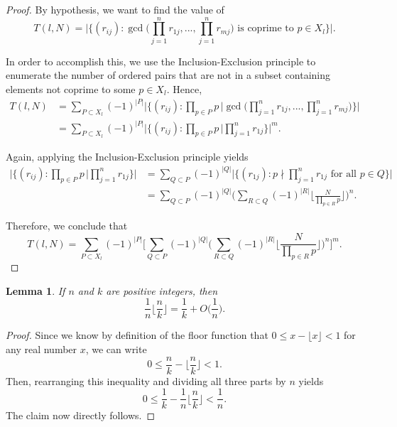 \documentclass[10pt,a4paper]{article}
\newtheorem{lemma}[theorem]{Lemma}
\theoremstyle{definition}
\theoremstyle{remark}
\newtheorem{note}{Note}[section]
\begin{document}
\begin{proof}


By hypothesis, we want to find the value of
$$T(l,N) = \Big|\Big\{(r_{ij}) : \gcd\Big(\prod_{j=1}^nr_{1j}, ..., \prod_{j=1}^{n} r_{mj}\Big) \text{ is coprime to } p\in X_l \Big\}\Big|.$$

In order to accomplish this, we use the Inclusion-Exclusion principle to enumerate the number of ordered pairs that are not in a subset containing elements not coprime to some $p\in X_l$. Hence, 
\begin{align}
T(l, N) &= \sum_{P\subset X_l}{(-1)^{|P|}}\Bigg|\Big\{(r_{ij}):\prod_{p\in P} p \, \Big| \gcd\Big(\prod_{j=1}^nr_{1j}, ... ,\prod_{j=1}^{n} r_{mj}\Big) \Big\} \Bigg|\\ &= \sum_{P\subset X_l}{(-1)^{|P|}} \Bigg|\Big\{(r_{ij}):\prod_{p\in P} p \, \Big| \prod_{j=1}^nr_{1j}\Big\}\Bigg|^m.
\end{align}
	
\noindent Again, applying the Inclusion-Exclusion principle yields
\begin{align}
\Bigg|\Big\{(r_{ij}):\prod_{p\in P} p \, \Big|\prod_{j=1}^nr_{1j}\Big\}\Bigg| &=\sum_{Q\subset P}(-1)^{|Q|}\Big|\Big\{(r_{1j}): p \nmid \prod_{j=1}^nr_{1j} \text{ for all } p\in Q \Big\}\Big|\\
&=\sum_{Q\subset P}(-1)^{|Q|}\Biggl(\sum_{R\subset Q}(-1)^{|R|}\Biggl\lfloor\frac{N}{\prod_{p\in R} p}\Biggr\rfloor\Biggr)^n.
\end{align}
	
\noindent Therefore, we conclude that
$$T(l,N)=\sum_{P\subset X_l}{(-1)^{|P|}}\Bigg[\sum_{Q\subset P}(-1)^{|Q|}\Big(\sum_{R\subset Q}(-1)^{|R|}\Big\lfloor\frac{N}{\prod_{p\in R} p}\Big\rfloor\Big)^n\Bigg]^m.$$
\end{proof}

\begin{lemma} If $n$ and $k$ are positive integers, then
$$\frac{1}{n} \Big\lfloor \frac{n}{k} \Big\rfloor = \frac{1}{k} + O\Big(\frac{1}{n}\Big).$$
\end{lemma}

\begin{proof}
Since we know by definition of the floor function that $0 \leq x - \lfloor x \rfloor < 1$ for any real number $x$, we can write
$$0 \leq \frac{n}{k} - \Big\lfloor \frac{n}{k} \Big\rfloor < 1.$$
Then, rearranging this inequality and dividing all three parts by $n$ yields
$$0 \leq \frac{1}{k} - \frac{1}{n}\Big\lfloor \frac{n}{k}\Big\rfloor < \frac{1}{n}.$$
The claim now directly follows.
\end{proof}
\end{document}
